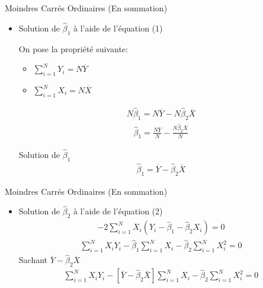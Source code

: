 \documentclass{beamer}
\begin{document}
\begin{frame}{Moindres Carrés Ordinaires (En sommation)}
\begin{itemize}
\item Solution de $\hat{\beta}_1$ à l'aide de l'équation (1)

\vspace{0.5cm}
On pose la propriété suivante: 
\begin{itemize}
\item $\sum_{i=1}^N Y_i=N\overline{Y}$ 
\item $\sum_{i=1}^N X_i=N\overline{X}$
\end{itemize}
\begin{align*}
N\hat{\beta}_1 = N\overline{Y} - N \hat{\beta}_2 \overline{X}
\end{align*}
\begin{align*}
\hat{\beta}_1=\frac{N\overline{Y}}{N}-\frac{N\hat{\beta}_2\overline{X}}{N}
\end{align*}

\begin{block}{Solution de $\hat{\beta}_1$}
\begin{align*}
\hat{\beta}_1=\overline{Y}-\hat{\beta}_2 \overline{X}
\end{align*}
\end{block}
\end{itemize}
\end{frame}

\begin{frame}{Moindres Carrés Ordinaires (En sommation)}
\begin{itemize}
\item Solution de $\hat{\beta}_2$ à l'aide de l'équation (2)
\begin{align*}
-2\sum_{i=1}^NX_i(Y_i-\hat{\beta}_1-\hat{\beta}_2 X_i)=0
\end{align*}
\begin{align*}
\sum_{i=1}^N X_i Y_i - \hat{\beta}_1 \sum_{i=1}^N X_i -\hat{\beta}_2\sum_{i=1}^N X_i^2=0
\end{align*}
Sachant $\overline{Y}-\hat{\beta}_2 \overline{X}$
\begin{align*}
\sum_{i=1}^N X_i Y_i - [\overline{Y}-\hat{\beta}_2 \overline{X}] \sum_{i=1}^N X_i -\hat{\beta}_2\sum_{i=1}^N X_i^2=0
\end{align*}
\end{itemize}
\end{frame}
\end{document}
